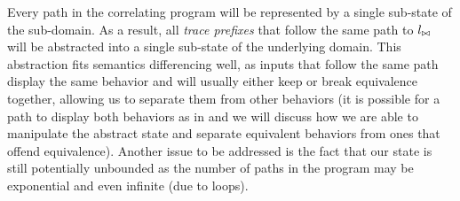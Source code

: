 
Every path in the correlating program will be represented by a single sub-state of the sub-domain. As a result, all \emph{trace prefixes} that follow the same path to $l_{\bowtie}$ will be abstracted into a single sub-state of the underlying domain. This abstraction fits semantics differencing well, as inputs that follow the same path display the same behavior and will usually either keep or break equivalence together, allowing us to separate them from other behaviors (it is possible for a path to display both behaviors as in  and we will discuss how we are able to manipulate the abstract state and separate equivalent behaviors from ones that offend equivalence). Another issue to be addressed is the fact that our state is still potentially unbounded as the number of paths in the program may be exponential and even infinite (due to loops).

